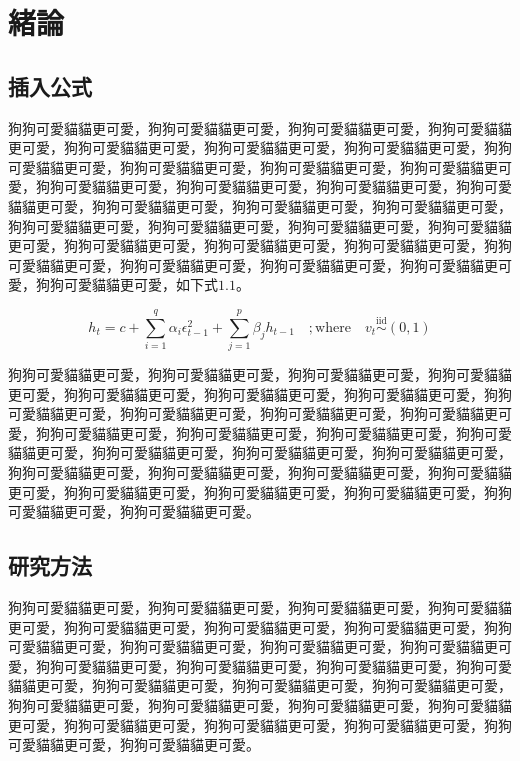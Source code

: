 \chapter{緒論}  %
\label{c:intro}


\section{插入公式}

狗狗可愛貓貓更可愛，狗狗可愛貓貓更可愛，狗狗可愛貓貓更可愛，狗狗可愛貓貓更可愛，狗狗可愛貓貓更可愛，狗狗可愛貓貓更可愛，狗狗可愛貓貓更可愛，狗狗可愛貓貓更可愛，狗狗可愛貓貓更可愛，狗狗可愛貓貓更可愛，狗狗可愛貓貓更可愛，狗狗可愛貓貓更可愛，狗狗可愛貓貓更可愛，狗狗可愛貓貓更可愛，狗狗可愛貓貓更可愛，狗狗可愛貓貓更可愛，狗狗可愛貓貓更可愛，狗狗可愛貓貓更可愛，狗狗可愛貓貓更可愛，狗狗可愛貓貓更可愛，狗狗可愛貓貓更可愛，狗狗可愛貓貓更可愛，狗狗可愛貓貓更可愛，狗狗可愛貓貓更可愛，狗狗可愛貓貓更可愛，狗狗可愛貓貓更可愛，狗狗可愛貓貓更可愛，狗狗可愛貓貓更可愛，狗狗可愛貓貓更可愛，狗狗可愛貓貓更可愛，如下式$1.1$。\par


\begin{equation}
h_{t} = c + \sum_{i=1}^{q}\alpha_{i} \epsilon^2_{t-1} + \sum_{j=1}^{p}\beta_{j} h_{t-1} \quad; \mbox{where} \quad v_{t}\overset{\mathrm{iid}}{\sim}(0,1)
\end{equation}



狗狗可愛貓貓更可愛，狗狗可愛貓貓更可愛，狗狗可愛貓貓更可愛，狗狗可愛貓貓更可愛，狗狗可愛貓貓更可愛，狗狗可愛貓貓更可愛，狗狗可愛貓貓更可愛，狗狗可愛貓貓更可愛，狗狗可愛貓貓更可愛，狗狗可愛貓貓更可愛，狗狗可愛貓貓更可愛，狗狗可愛貓貓更可愛，狗狗可愛貓貓更可愛，狗狗可愛貓貓更可愛，狗狗可愛貓貓更可愛，狗狗可愛貓貓更可愛，狗狗可愛貓貓更可愛，狗狗可愛貓貓更可愛，狗狗可愛貓貓更可愛，狗狗可愛貓貓更可愛，狗狗可愛貓貓更可愛，狗狗可愛貓貓更可愛，狗狗可愛貓貓更可愛，狗狗可愛貓貓更可愛，狗狗可愛貓貓更可愛，狗狗可愛貓貓更可愛，狗狗可愛貓貓更可愛。

\section{研究方法}

狗狗可愛貓貓更可愛，狗狗可愛貓貓更可愛，狗狗可愛貓貓更可愛，狗狗可愛貓貓更可愛，狗狗可愛貓貓更可愛，狗狗可愛貓貓更可愛，狗狗可愛貓貓更可愛，狗狗可愛貓貓更可愛，狗狗可愛貓貓更可愛，狗狗可愛貓貓更可愛，狗狗可愛貓貓更可愛，狗狗可愛貓貓更可愛，狗狗可愛貓貓更可愛，狗狗可愛貓貓更可愛，狗狗可愛貓貓更可愛，狗狗可愛貓貓更可愛，狗狗可愛貓貓更可愛，狗狗可愛貓貓更可愛，狗狗可愛貓貓更可愛，狗狗可愛貓貓更可愛，狗狗可愛貓貓更可愛，狗狗可愛貓貓更可愛，狗狗可愛貓貓更可愛，狗狗可愛貓貓更可愛，狗狗可愛貓貓更可愛，狗狗可愛貓貓更可愛，狗狗可愛貓貓更可愛。